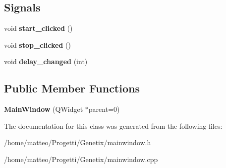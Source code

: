 \subsection*{Signals}
\begin{DoxyCompactItemize}
\item 
\mbox{\label{classMainWindow_a4f22c3b06bfbedb52929d213cd5895cb}} 
void {\bfseries start\+\_\+clicked} ()
\item 
\mbox{\label{classMainWindow_a008d7f5813cb95da3885cd60f0e811e5}} 
void {\bfseries stop\+\_\+clicked} ()
\item 
\mbox{\label{classMainWindow_aef0d7f0f385563a0805f6dd54c6e90de}} 
void {\bfseries delay\+\_\+changed} (int)
\end{DoxyCompactItemize}
\subsection*{Public Member Functions}
\begin{DoxyCompactItemize}
\item 
\mbox{\label{classMainWindow_a8b244be8b7b7db1b08de2a2acb9409db}} 
{\bfseries Main\+Window} (Q\+Widget $\ast$parent=0)
\end{DoxyCompactItemize}


The documentation for this class was generated from the following files\+:\begin{DoxyCompactItemize}
\item 
/home/matteo/\+Progetti/\+Genetix/mainwindow.\+h\item 
/home/matteo/\+Progetti/\+Genetix/mainwindow.\+cpp\end{DoxyCompactItemize}
